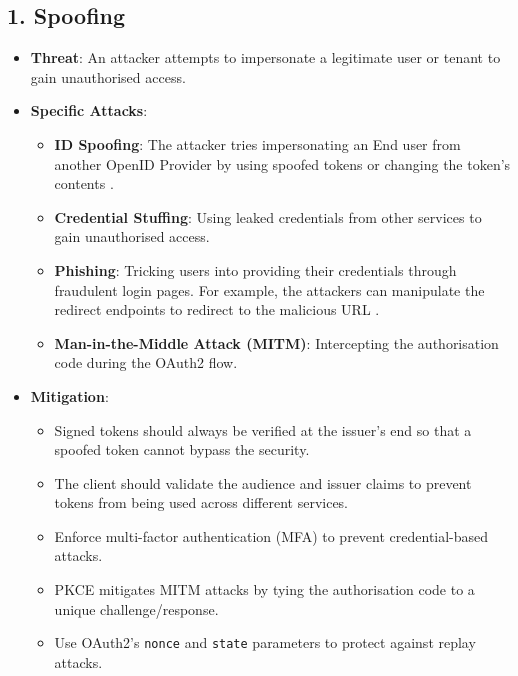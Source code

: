 \subsection*{1. Spoofing}
\begin{itemize}
    \item \textbf{Threat}: An attacker attempts to impersonate a legitimate user or tenant to gain unauthorised access.
    \item \textbf{Specific Attacks}:
    \begin{itemize}
        \item \textbf{ID Spoofing}: The attacker tries impersonating an End user from another OpenID Provider by using spoofed tokens or changing the token's contents \citep{oidc_attacks}.
        \item \textbf{Credential Stuffing}: Using leaked credentials from other services to gain unauthorised access.
        \item \textbf{Phishing}: Tricking users into providing their credentials through fraudulent login pages. For example, the attackers can manipulate the redirect endpoints to redirect to the malicious URL \citep{open_redirect_oidc_threat}.
        \item \textbf{Man-in-the-Middle Attack (MITM)}: Intercepting the authorisation code during the OAuth2 flow.
    \end{itemize}
    \item \textbf{Mitigation}:
    \begin{itemize}
        \item Signed tokens should always be verified at the issuer's end so that a spoofed token cannot bypass the security.
        \item The client should validate the audience and issuer claims to prevent tokens from being used across different services.
        \item Enforce multi-factor authentication (MFA) to prevent credential-based attacks.
        \item PKCE mitigates MITM attacks by tying the authorisation code to a unique challenge/response.
        \item Use OAuth2’s \texttt{nonce} and \texttt{state} parameters to protect against replay attacks.
    \end{itemize}
\end{itemize}

